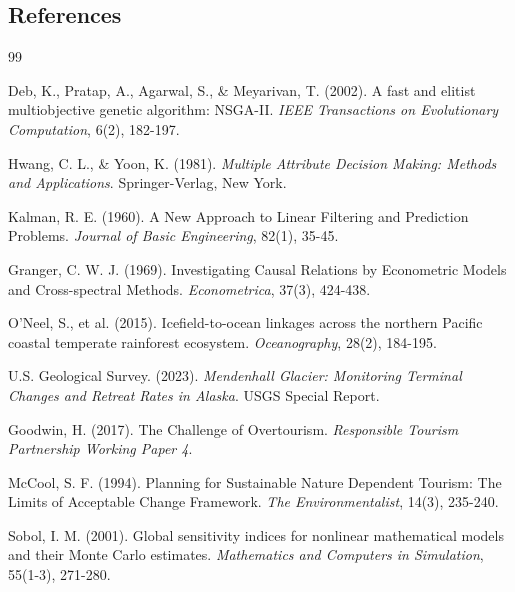 \documentclass{mcmthesis}
\begin{document}
\newpage
\begin{appendices}

\section{References}
\begin{thebibliography}{99}

    Deb, K., Pratap, A., Agarwal, S., \& Meyarivan, T. (2002). 
    A fast and elitist multiobjective genetic algorithm: NSGA-II. 
    \textit{IEEE Transactions on Evolutionary Computation}, 6(2), 182-197.

    Hwang, C. L., \& Yoon, K. (1981). 
    \textit{Multiple Attribute Decision Making: Methods and Applications}. 
    Springer-Verlag, New York.

    Kalman, R. E. (1960). 
    A New Approach to Linear Filtering and Prediction Problems. 
    \textit{Journal of Basic Engineering}, 82(1), 35-45.

    Granger, C. W. J. (1969). 
    Investigating Causal Relations by Econometric Models and Cross-spectral Methods. 
    \textit{Econometrica}, 37(3), 424-438.

    O'Neel, S., et al. (2015). 
    Icefield-to-ocean linkages across the northern Pacific coastal temperate rainforest ecosystem. 
    \textit{Oceanography}, 28(2), 184-195.

    U.S. Geological Survey. (2023). 
    \textit{Mendenhall Glacier: Monitoring Terminal Changes and Retreat Rates in Alaska}. 
    USGS Special Report.

    Goodwin, H. (2017). 
    The Challenge of Overtourism. 
    \textit{Responsible Tourism Partnership Working Paper 4}.

    McCool, S. F. (1994). 
    Planning for Sustainable Nature Dependent Tourism: The Limits of Acceptable Change Framework. 
    \textit{The Environmentalist}, 14(3), 235-240.

    Sobol, I. M. (2001). 
    Global sensitivity indices for nonlinear mathematical models and their Monte Carlo estimates. 
    \textit{Mathematics and Computers in Simulation}, 55(1-3), 271-280.


\end{thebibliography}
\end{appendices}
\end{document}
